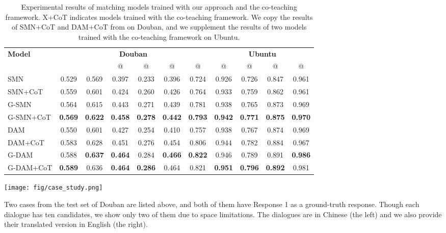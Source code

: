 \documentclass[11pt,a4paper]{article}
\begin{document}
	\begin{table*}[t]
		\small
		\begin{center}
\begin{tabular}{l||cccccc||cccc}
\multicolumn{1}{l||}{\multirow{2}{*}{\textbf{Model}}}  & \multicolumn{6}{c||}{\textbf{Douban}} & \multicolumn{4}{c}{\textbf{Ubuntu}} \\ \cline{2-11} 
				&  &  & @ & @ & @ & @  & @ & @ & @ & @ \\ 
				\hline
				SMN & 0.529 & 0.569 & 0.397 & 0.233 & 0.396 & 0.724   & 0.926 & 0.726 & 0.847 & 0.961\\ 
				SMN+CoT & 0.559 & 0.601 & 0.424 & 0.260 & 0.426 & 0.764   & 0.933 & 0.759 & 0.862 & 0.961\\ 
				\hdashline
				G-SMN & 0.564 & 0.615 & 0.443 & 0.271 & 0.439 & 0.781   & 0.938 & 0.765 & 0.873 & 0.969\\
				G-SMN+CoT & \textbf{0.569} & \textbf{0.622} & \textbf{0.458} & \textbf{0.278} & \textbf{0.442} & \textbf{0.793}   & \textbf{0.942} & \textbf{0.771} & \textbf{0.875} & \textbf{0.970} \\
				\hline DAM & 0.550 & 0.601 & 0.427 & 0.254 & 0.410 & 0.757   & 0.938 & 0.767 & 0.874 & 0.969\\ 
				DAM+CoT & 0.583 & 0.628 & 0.451 & 0.276 & 0.454 & 0.806   & 0.944 & 0.782 & 0.884 & 0.967\\ 
				\hdashline
				G-DAM & 0.588 & \textbf{0.637} & \textbf{0.464} & 0.284 & \textbf{0.466} & \textbf{0.822}   & 0.946 & 0.789 & 0.891 & \textbf{0.986}\\
				G-DAM+CoT & \textbf{0.589} & 0.636 & \textbf{0.464} & \textbf{0.286} & 0.464 & 0.821   & \textbf{0.951} & \textbf{0.796} & \textbf{0.892} & 0.981\\
\end{tabular}
\end{center}
		\caption{\label{coteach_result_table} Experimental results of matching models trained with our approach and the co-teaching framework. X+CoT indicates models trained with the co-teaching framework. We copy the results of SMN+CoT and DAM+CoT from \citet{feng2019learning} on Douban, and we supplement the results of two models trained with the co-teaching framework on Ubuntu.} \end{table*}
	\begin{table*}[t]
		\centering
		\texttt{[image: fig/case\_study.png]}
		\caption{Two cases from the test set of Douban are listed above, and both of them have Response 1 as a ground-truth response. Though each dialogue has ten candidates, we show only two of them due to space limitations. The dialogues are in Chinese (the left) and we also provide their translated version in English (the right).}
		\label{case_study}
	\end{table*}
	
\end{document}
